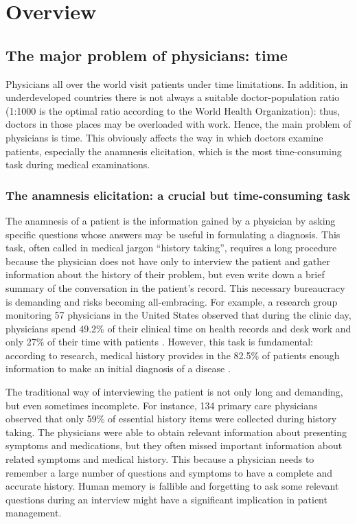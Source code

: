 \chapter{Overview}
\label{cha:intro}

\section{The major problem of physicians: time}
\label{sec:problem_doctors}
Physicians all over the world visit patients under time limitations. In addition, in underdeveloped countries there is not always a suitable doctor-population ratio (1:1000 is the optimal ratio according to the World Health Organization)\cite{johndocument}: thus, doctors in those places may be overloaded with work. Hence, the main problem of physicians is time. This obviously affects the way in which doctors examine patients, especially the anamnesis elicitation, which is the most time-consuming task during medical examinations.

\subsection{The anamnesis elicitation: a crucial but time-consuming task}

The anamnesis of a patient is the information gained by a physician by asking specific questions whose answers may be useful in formulating a diagnosis\cite{historytakingwiki}. This task, often called in medical jargon “history taking”, requires a long procedure because the physician does not have only to interview the patient and gather information about the history of their problem, but even write down a brief summary of the conversation in the patient’s record. This necessary bureaucracy is demanding and risks becoming all-embracing. For example, a research group monitoring 57 physicians in the United States observed that during the clinic day, physicians spend 49.2\% of their clinical time on health records and desk work and only 27\% of their time with patients \cite{sinsky}. However, this task is fundamental: according to research, medical history provides in the 82.5\% of patients enough information to make an initial diagnosis of a disease \cite{hampton1975}.

The traditional way of interviewing the patient is not only long and demanding, but even sometimes incomplete. For instance, 134 primary care physicians observed that only 59\% of essential history items were collected during history taking. The physicians were able to obtain relevant information about presenting symptoms and medications, but they often missed important information about related symptoms and medical history. This because a physician needs to remember a large number of questions and symptoms to have a complete and accurate history. Human memory is fallible and forgetting to ask some relevant questions during an interview might have a significant implication in patient management.\cite{johndocument}

